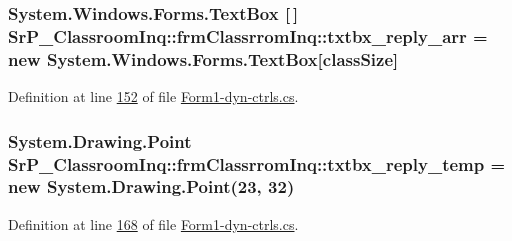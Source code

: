 \hypertarget{class_sr_p___classroom_inq_1_1frm_classrrom_inq_a3411157caafbe33c31a364fafd548afb}{
\subsubsection[{txtbx\-\_\-reply\-\_\-arr}]{\setlength{\rightskip}{0pt plus 5cm}\-System.\-Windows.\-Forms.\-Text\-Box \mbox{[}$\,$\mbox{]} {\bf \-Sr\-P\-\_\-\-Classroom\-Inq\-::frm\-Classrrom\-Inq\-::txtbx\-\_\-reply\-\_\-arr} = new \-System.\-Windows.\-Forms.\-Text\-Box\mbox{[}{\bf class\-Size}\mbox{]}}}
\label{class_sr_p___classroom_inq_1_1frm_classrrom_inq_a3411157caafbe33c31a364fafd548afb}


\-Definition at line \hyperlink{_form1-dyn-ctrls_8cs_source_l00152}{152} of file \hyperlink{_form1-dyn-ctrls_8cs_source}{\-Form1-\/dyn-\/ctrls.\-cs}.

\hypertarget{class_sr_p___classroom_inq_1_1frm_classrrom_inq_a0b175596cb83997b38795ee916c978f1}{
\subsubsection[{txtbx\-\_\-reply\-\_\-temp}]{\setlength{\rightskip}{0pt plus 5cm}\-System.\-Drawing.\-Point {\bf \-Sr\-P\-\_\-\-Classroom\-Inq\-::frm\-Classrrom\-Inq\-::txtbx\-\_\-reply\-\_\-temp} = new \-System.\-Drawing.\-Point(23, 32)}}
\label{class_sr_p___classroom_inq_1_1frm_classrrom_inq_a0b175596cb83997b38795ee916c978f1}


\-Definition at line \hyperlink{_form1-dyn-ctrls_8cs_source_l00168}{168} of file \hyperlink{_form1-dyn-ctrls_8cs_source}{\-Form1-\/dyn-\/ctrls.\-cs}.

